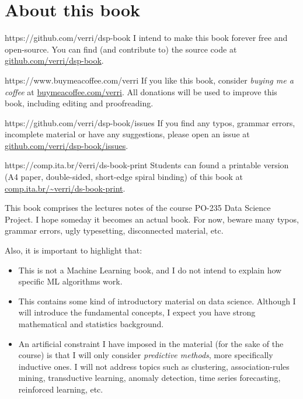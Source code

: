 \chapter{About this book}

\begin{parwithqr}{https://github.com/verri/dsp-book}
  I intend to make this book forever free and open-source. You can find (and contribute
  to) the source code at \href{\aurl}{github.com/verri/dsp-book}.
\end{parwithqr}

\vfill

\begin{parwithqr}{https://www.buymeacoffee.com/verri}
  If you like this book, consider \emph{buying me a coffee} at
  \href{\aurl}{buymeacoffee.com/verri}.   All donations will be used to improve this book,
  including editing and proofreading.
\end{parwithqr}

\vfill

\begin{parwithqr}{https://github.com/verri/dsp-book/issues}
  If you find any typos, grammar errors, incomplete material or have any suggestions,
  please open an issue at \href{\aurl}{github.com/verri/dsp-book/issues}.
\end{parwithqr}

\vfill

\begin{parwithqr}{https://comp.ita.br/\~verri/ds-book-print}
  Students can found a printable version (A4 paper, double-sided, short-edge spiral
  binding) of this book at \href{\aurl}{comp.ita.br/\textasciitilde{}verri/ds-book-print}.
\end{parwithqr}

\newpage
This book comprises the lectures notes of the course PO-235 Data Science Project.
I hope someday it becomes an actual book. For now, beware many typos, grammar errors, ugly
typesetting, disconnected material, etc.

Also, it is important to highlight that:
\begin{itemize}
  \item This is not a Machine Learning book, and I do not intend to explain how specific
    ML algorithms work.
  \item This contains some kind of introductory material on data science.  Although I will
    introduce the fundamental concepts, I expect you have strong mathematical and
    statistics background.
  \item An artificial constraint I have imposed in the material (for the sake of the
    course) is that I will only consider \emph{predictive methods}, more specifically
    inductive ones. I will not address topics such as clustering, association-rules
    mining, transductive learning, anomaly detection, time series forecasting, reinforced
    learning, etc.
\end{itemize}

